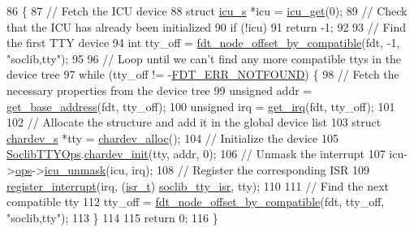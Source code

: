 \begin{DoxyCode}
86 \{
87     \textcolor{comment}{// Fetch the ICU device}
88     \textcolor{keyword}{struct }\hyperlink{structicu__s}{icu\_s} *icu = \hyperlink{icu_8h_a8ea2773b171799420c4542ff4e3bac3c}{icu\_get}(0);
89     \textcolor{comment}{// Check that the ICU has already been initialized}
90     \textcolor{keywordflow}{if} (!icu)
91         \textcolor{keywordflow}{return} -1;
92 
93     \textcolor{comment}{// Find the first TTY device}
94     \textcolor{keywordtype}{int} tty\_off = \hyperlink{fdt__ro_8c_a7fee20e876e2af4dd32e987c6c8f104a}{fdt\_node\_offset\_by\_compatible}(fdt, -1, \textcolor{stringliteral}{"soclib,tty"});
95 
96     \textcolor{comment}{// Loop until we can't find any more compatible ttys in the device tree}
97     \textcolor{keywordflow}{while} (tty\_off != -\hyperlink{libfdt_8h_a93cfa052f4b28df4bfc7d336b692fa07}{FDT\_ERR\_NOTFOUND}) \{
98         \textcolor{comment}{// Fetch the necessary properties from the device tree}
99         \textcolor{keywordtype}{unsigned} addr = \hyperlink{almo1-mips_2soc_8c_a8f32c2785fa3edd070abdaa34c96f6a7}{get\_base\_address}(fdt, tty\_off);
100         \textcolor{keywordtype}{unsigned} irq = \hyperlink{almo1-mips_2soc_8c_a7bd21ef4af7971db5dad06231290d8d1}{get\_irq}(fdt, tty\_off);
101 
102         \textcolor{comment}{// Allocate the structure and add it in the global device list}
103         \textcolor{keyword}{struct }\hyperlink{structchardev__s}{chardev\_s} *tty = \hyperlink{chardev_8h_a0f9abac4f27deb18dd30410b33ba7e72}{chardev\_alloc}();
104         \textcolor{comment}{// Initialize the device}
105         \hyperlink{soclib-tty_8c_ac60ea3e14652d47e0814fac85c18b2ff}{SoclibTTYOps}.\hyperlink{structchardev__ops__s_acde8ff309c1553a2209756737f2b2d31}{chardev\_init}(tty, addr, 0);
106         \textcolor{comment}{// Unmask the interrupt}
107         icu->\hyperlink{structicu__s_a7f989a94a922fa1c782cfcf7547bd8c5}{ops}->\hyperlink{structicu__ops__s_a4aee28cc809733a67481e782c1efd1fa}{icu\_unmask}(icu, irq);
108         \textcolor{comment}{// Register the corresponding ISR}
109         \hyperlink{kirq_8c_a7bb6fb99500c6f10708c7653cef722e8}{register\_interrupt}(irq, (\hyperlink{kirq_8h_a6c476c213249d7236d7888257e71628d}{isr\_t}) \hyperlink{soclib-tty_8c_abee08020bafa1f698839a8d477dcdafa}{soclib\_tty\_isr}, tty);
110 
111         \textcolor{comment}{// Find the next compatible tty}
112         tty\_off = \hyperlink{fdt__ro_8c_a7fee20e876e2af4dd32e987c6c8f104a}{fdt\_node\_offset\_by\_compatible}(fdt, tty\_off, \textcolor{stringliteral}{"soclib,tty"});
113     \}
114 
115     \textcolor{keywordflow}{return} 0;
116 \}
\end{DoxyCode}
